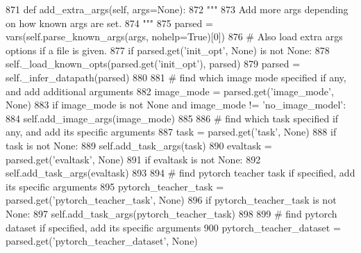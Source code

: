 \begin{DoxyCode}
871     \textcolor{keyword}{def }add\_extra\_args(self, args=None):
872         \textcolor{stringliteral}{"""}
873 \textcolor{stringliteral}{        Add more args depending on how known args are set.}
874 \textcolor{stringliteral}{        """}
875         parsed = vars(self.parse\_known\_args(args, nohelp=\textcolor{keyword}{True})[0])
876         \textcolor{comment}{# Also load extra args options if a file is given.}
877         \textcolor{keywordflow}{if} parsed.get(\textcolor{stringliteral}{'init\_opt'}, \textcolor{keywordtype}{None}) \textcolor{keywordflow}{is} \textcolor{keywordflow}{not} \textcolor{keywordtype}{None}:
878             self.\_load\_known\_opts(parsed.get(\textcolor{stringliteral}{'init\_opt'}), parsed)
879         parsed = self.\_infer\_datapath(parsed)
880 
881         \textcolor{comment}{# find which image mode specified if any, and add additional arguments}
882         image\_mode = parsed.get(\textcolor{stringliteral}{'image\_mode'}, \textcolor{keywordtype}{None})
883         \textcolor{keywordflow}{if} image\_mode \textcolor{keywordflow}{is} \textcolor{keywordflow}{not} \textcolor{keywordtype}{None} \textcolor{keywordflow}{and} image\_mode != \textcolor{stringliteral}{'no\_image\_model'}:
884             self.add\_image\_args(image\_mode)
885 
886         \textcolor{comment}{# find which task specified if any, and add its specific arguments}
887         task = parsed.get(\textcolor{stringliteral}{'task'}, \textcolor{keywordtype}{None})
888         \textcolor{keywordflow}{if} task \textcolor{keywordflow}{is} \textcolor{keywordflow}{not} \textcolor{keywordtype}{None}:
889             self.add\_task\_args(task)
890         evaltask = parsed.get(\textcolor{stringliteral}{'evaltask'}, \textcolor{keywordtype}{None})
891         \textcolor{keywordflow}{if} evaltask \textcolor{keywordflow}{is} \textcolor{keywordflow}{not} \textcolor{keywordtype}{None}:
892             self.add\_task\_args(evaltask)
893 
894         \textcolor{comment}{# find pytorch teacher task if specified, add its specific arguments}
895         pytorch\_teacher\_task = parsed.get(\textcolor{stringliteral}{'pytorch\_teacher\_task'}, \textcolor{keywordtype}{None})
896         \textcolor{keywordflow}{if} pytorch\_teacher\_task \textcolor{keywordflow}{is} \textcolor{keywordflow}{not} \textcolor{keywordtype}{None}:
897             self.add\_task\_args(pytorch\_teacher\_task)
898 
899         \textcolor{comment}{# find pytorch dataset if specified, add its specific arguments}
900         pytorch\_teacher\_dataset = parsed.get(\textcolor{stringliteral}{'pytorch\_teacher\_dataset'}, \textcolor{keywordtype}{None})

\end{DoxyCode}
